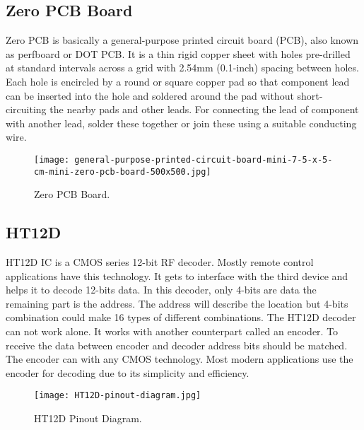 \subsection{Zero PCB Board}
Zero PCB is basically a general-purpose printed circuit board (PCB), also known as perfboard or DOT PCB. It is a thin rigid copper sheet with holes pre-drilled at standard intervals across a grid with 2.54mm (0.1-inch) spacing between holes. Each hole is encircled by a round or square copper pad so that component lead can be inserted into the hole and soldered around the pad without short-circuiting the nearby pads and other leads. For connecting the lead of component with another lead, solder these together or join these using a suitable conducting wire.
\begin{figure}[h]
	\centering
	\texttt{[image: general-purpose-printed-circuit-board-mini-7-5-x-5-cm-mini-zero-pcb-board-500x500.jpg]}
	\caption{Zero PCB Board.}
\end{figure}
\subsection{HT12D}
HT12D IC is a CMOS series 12-bit RF decoder. Mostly remote control applications have this technology. It gets to interface with the third device and helps it to decode 12-bits data. In this decoder, only 4-bits are data the remaining part is the address. The address will describe the location but 4-bits combination could make 16 types of different combinations. The HT12D decoder can not work alone. It works with another counterpart called an encoder. To receive the data between encoder and decoder address bits should be matched. The encoder can with any CMOS technology. Most modern applications use the encoder for decoding due to its simplicity and efficiency.\pagebreak
\begin{figure}[h]
	\centering
	\texttt{[image: HT12D-pinout-diagram.jpg]}
	\caption{HT12D Pinout Diagram.}
\end{figure}